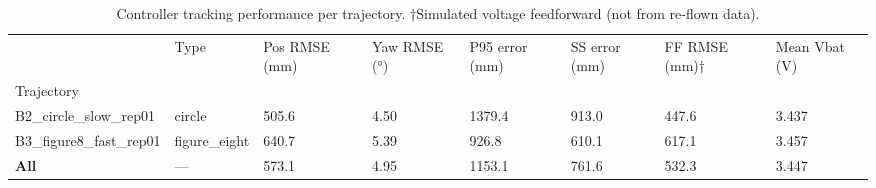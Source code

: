 \begin{table}
\caption{Controller tracking performance per trajectory. †Simulated voltage feedforward (not from re-flown data). }
\label{tab:control}
\begin{tabular}{llllllll}
\toprule
 & Type & Pos RMSE (mm) & Yaw RMSE (°) & P95 error (mm) & SS error (mm) & FF RMSE (mm)† & Mean Vbat (V) \\
Trajectory &  &  &  &  &  &  &  \\
\midrule
B2_circle_slow_rep01 & circle & 505.6 & 4.50 & 1379.4 & 913.0 & 447.6 & 3.437 \\
B3_figure8_fast_rep01 & figure_eight & 640.7 & 5.39 & 926.8 & 610.1 & 617.1 & 3.457 \\
\textbf{All} & — & 573.1 & 4.95 & 1153.1 & 761.6 & 532.3 & 3.447 \\
\bottomrule
\end{tabular}
\end{table}
